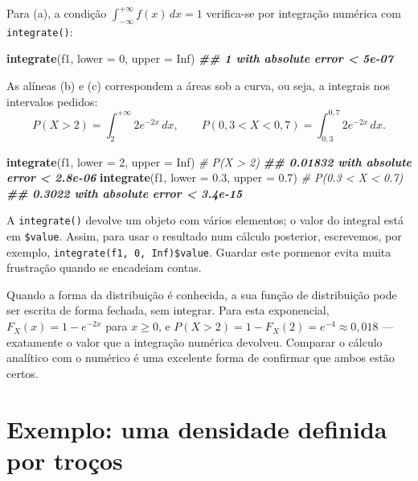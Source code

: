 \documentclass[
  portuguese,
  11pt,
  openany]{book}
\newenvironment{Shaded}{\begin{snugshade}}{\end{snugshade}}
\newcommand{\AttributeTok}[1]{\textcolor[rgb]{0.13,0.29,0.53}{#1}}
\newcommand{\CommentTok}[1]{\textcolor[rgb]{0.56,0.35,0.01}{\textit{#1}}}
\newcommand{\ConstantTok}[1]{\textcolor[rgb]{0.56,0.35,0.01}{#1}}
\newcommand{\DecValTok}[1]{\textcolor[rgb]{0.00,0.00,0.81}{#1}}
\newcommand{\DocumentationTok}[1]{\textcolor[rgb]{0.56,0.35,0.01}{\textbf{\textit{#1}}}}
\newcommand{\FloatTok}[1]{\textcolor[rgb]{0.00,0.00,0.81}{#1}}
\newcommand{\FunctionTok}[1]{\textcolor[rgb]{0.13,0.29,0.53}{\textbf{#1}}}
\newcommand{\NormalTok}[1]{#1}
\begin{document}
Para (a), a condição \(\int_{-\infty}^{+\infty} f(x)\,dx = 1\) verifica-se por integração
numérica com \texttt{integrate()}:

\begin{Shaded}
\begin{Highlighting}[]
\FunctionTok{integrate}\NormalTok{(f1, }\AttributeTok{lower =} \DecValTok{0}\NormalTok{, }\AttributeTok{upper =} \ConstantTok{Inf}\NormalTok{)}
\DocumentationTok{\#\# 1 with absolute error \textless{} 5e{-}07}
\end{Highlighting}
\end{Shaded}

As alíneas (b) e (c) correspondem a áreas sob a curva, ou seja, a integrais nos
intervalos pedidos:
\[P(X > 2) = \int_2^{+\infty} 2e^{-2x}\,dx, \qquad P(0{,}3 < X < 0{,}7) = \int_{0{,}3}^{0{,}7} 2e^{-2x}\,dx.\]

\begin{Shaded}
\begin{Highlighting}[]
\FunctionTok{integrate}\NormalTok{(f1, }\AttributeTok{lower =} \DecValTok{2}\NormalTok{, }\AttributeTok{upper =} \ConstantTok{Inf}\NormalTok{)      }\CommentTok{\# P(X \textgreater{} 2)}
\DocumentationTok{\#\# 0.01832 with absolute error \textless{} 2.8e{-}06}
\FunctionTok{integrate}\NormalTok{(f1, }\AttributeTok{lower =} \FloatTok{0.3}\NormalTok{, }\AttributeTok{upper =} \FloatTok{0.7}\NormalTok{)    }\CommentTok{\# P(0.3 \textless{} X \textless{} 0.7)}
\DocumentationTok{\#\# 0.3022 with absolute error \textless{} 3.4e{-}15}
\end{Highlighting}
\end{Shaded}

A \texttt{integrate()} devolve um objeto com vários elementos; o valor do integral está em
\texttt{\$value}. Assim, para usar o resultado num cálculo posterior, escrevemos, por exemplo,
\texttt{integrate(f1,\ 0,\ Inf)\$value}. Guardar este pormenor evita muita frustração quando se
encadeiam contas.

Quando a forma da distribuição é conhecida, a sua função de distribuição pode ser
escrita de forma fechada, sem integrar. Para esta exponencial,
\(F_X(x) = 1 - e^{-2x}\) para \(x \geq 0\), e \(P(X > 2) = 1 - F_X(2) = e^{-4} \approx 0{,}018\)
--- exatamente o valor que a integração numérica devolveu. Comparar o cálculo analítico
com o numérico é uma excelente forma de confirmar que ambos estão certos.

\section{Exemplo: uma densidade definida por troços}\label{exemplo-uma-densidade-definida-por-trouxe7os}
\end{document}
